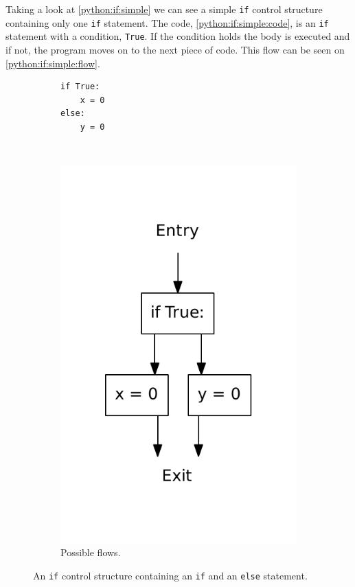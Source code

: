 Taking a look at \cref{python:if:simple} we can see a simple \texttt{if} control structure containing only one \texttt{if} statement.
The code, \cref{python:if:simple:code}, is an \texttt{if} statement with a condition, \texttt{True}.
If the condition holds the body is executed and if not, the program moves on to the next piece of code.
This flow can be seen on \cref{python:if:simple:flow}.


\begin{figure}
  \centering
  \begin{subfigure}[b]{0.4\textwidth}
    \begin{lstlisting}[style=python, caption={Code example.}, label={python:if:else:code}]
if True:
    x = 0
else:
    y = 0
    \end{lstlisting}
  \end{subfigure}
  ~ %
  \begin{subfigure}[b]{0.4\textwidth}
    \centering
    \includegraphics[scale=.5]{./figures/if_else.pdf}
    \caption{Possible flows.}
    \label{python:if:else:flow}
  \end{subfigure}
  \caption{An \texttt{if} control structure containing an \texttt{if} and an \texttt{else} statement.}
  \label{python:if:else}
\end{figure}

